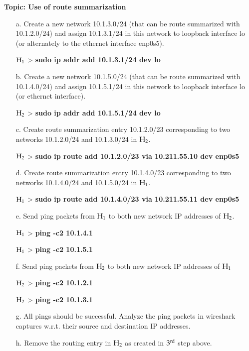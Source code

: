 \begin{multicols}{2}
\textbf{Topic: Use of route summarization}

\vspace{-.5cm}

\begin{itemize}
\item[a.] Create a new network 10.1.3.0/24 (that can be route summarized with 10.1.2.0/24) and assign 10.1.3.1/24 in this network to loopback interface lo (or alternately to the ethernet interface enp0s5).

${\rm H}_{1}$ > \textbf{sudo ip addr add 10.1.3.1/24 dev lo}

\item[b.] Create a new network 10.1.5.0/24 (that can be route summarized with 10.1.4.0/24) and assign 10.1.5.1/24 in this network to loopback interface lo (or ethernet interface).

${\rm H}_{2}$ > \textbf{sudo ip addr add 10.1.5.1/24 dev lo}

\item[c.] Create route summarization entry 10.1.2.0/23 corresponding to two networks 10.1.2.0/24 and 10.1.3.0/24 in ${\rm H}_{2}$.

${\rm H}_{2}$ > \textbf{sudo ip route add 10.1.2.0/23 via 10.211.55.10 dev enp0s5}

\item[d.] Create route summarization entry 10.1.4.0/23 corresponding to two networks 10.1.4.0/24 and 10.1.5.0/24 in ${\rm H}_{1}$.

${\rm H}_{1}$ > \textbf{sudo ip route add 10.1.4.0/23 via 10.211.55.11 dev enp0s5}

\item[e.] Send ping packets from ${\rm H}_{1}$ to both new network IP addresses of ${\rm H}_{2}$. 

${\rm H}_{1}$ > \textbf{ping -c2 10.1.4.1}

${\rm H}_{1}$ > \textbf{ping -c2 10.1.5.1}

\item[f.] Send ping packets from ${\rm H}_{2}$ to both new network IP addresses of ${\rm H}_{1}$

${\rm H}_{2}$  > \textbf{ping -c2 10.1.2.1}

${\rm H}_{2}$  > \textbf{ping -c2 10.1.3.1}

\item[g.] All pings should be successful. Analyze the ping packets in wireshark captures w.r.t. their source and destination IP addresses.

\item[h.] Remove the routing entry in ${\rm H}_{2}$ as created in $3^{\rm rd}$ step above.


\end{itemize}
\end{multicols}
